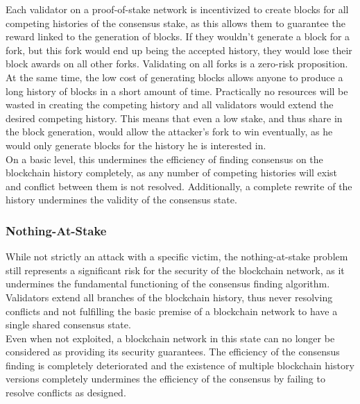 \documentclass[12pt,a4paper]{article}
\begin{document}
Each validator on a proof-of-stake network is incentivized to create blocks for all competing histories of the consensus stake, as this allows them to guarantee the reward linked to the generation of blocks. If they wouldn't generate a block for a fork, but this fork would end up being the accepted history, they would lose their block awards on all other forks. Validating on all forks is a zero-risk proposition.\\

At the same time, the low cost of generating blocks allows anyone to produce a long history of blocks in a short amount of time. Practically no resources will be wasted in creating the competing history and all validators would extend the desired competing history. This means that even a low stake, and thus share in the block generation, would allow the attacker's fork to win eventually, as he would only generate blocks for the history he is interested in.\\

On a basic level, this undermines the efficiency of finding consensus on the blockchain history completely, as any number of competing histories will exist and conflict between them is not resolved. Additionally, a complete rewrite of the history undermines the validity of the consensus state.\\

\subsubsection{Nothing-At-Stake}

While not strictly an attack with a specific victim, the nothing-at-stake problem still represents a significant risk for the security of the blockchain network, as it undermines the fundamental functioning of the consensus finding algorithm. Validators extend all branches of the blockchain history, thus never resolving conflicts and not fulfilling the basic premise of a blockchain network to have a single shared consensus state.\\

Even when not exploited, a blockchain network in this state can no longer be considered as providing its security guarantees. The efficiency of the consensus finding is completely deteriorated and the existence of multiple blockchain history versions completely undermines the efficiency of the consensus by failing to resolve conflicts as designed.\\
\end{document}
